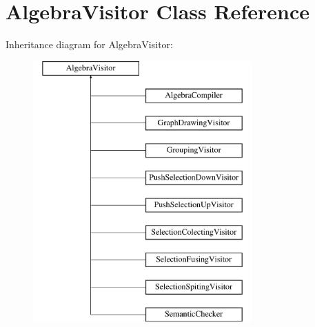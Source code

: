 \hypertarget{class_algebra_visitor}{\section{Algebra\+Visitor Class Reference}
\label{class_algebra_visitor}
}
Inheritance diagram for Algebra\+Visitor\+:\begin{figure}[H]
\begin{center}
\leavevmode
\includegraphics[height=10.000000cm]{class_algebra_visitor}
\end{center}
\end{figure}
